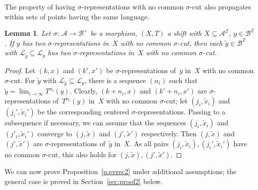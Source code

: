 \documentclass{amsart}
\newtheorem{lemma}{Lemma}[section]
\theoremstyle{definition}
\theoremstyle{remark}
\numberwithin{equation}{section}
\begin{document}
The property of having $\sigma$-representations with no common $\sigma$-cut also propagates within sets of points having the same language. 

\begin{lemma} \label{l:oneforall}
Let $\sigma:\, \mathcal{A} \to \mathcal{B}^+$ be a morphism, $(X,T)$ a shift with $X \subseteq \mathcal{A}^\mathbb{Z}$, $y \in \mathcal{B}^\mathbb{Z}$.
If $y$ has two $\sigma$-representations in~$X$ with no common $\sigma$-cut, then each $\tilde{y} \in \mathcal{B}^\mathbb{Z}$ with $\mathcal{L}_{\tilde{y}} \subseteq \mathcal{L}_y$ has two $\sigma$-representations in~$X$ with no common $\sigma$-cut. 
\end{lemma}

\begin{proof}
Let $(k,x)$ and $(k',x')$ be $\sigma$-representations of~$y$ in~$X$ with no common $\sigma$-cut.
For $\tilde{y}$ with $\mathcal{L}_{\tilde{y}} \subseteq \mathcal{L}_y$, there is a sequence $(n_i)$ such that $\tilde{y} = \lim_{i\to\infty} T^{n_i}(y)$. 
Clearly, $(k{+}n_i,x)$ and $(k'{+}n_i,x')$ are $\sigma$-representations of~$T^{n_i}(y)$ in~$X$ with no common $\sigma$-cut; let $(j_i, \tilde{x}_i)$ and $(j_i', \tilde{x}_i')$ be the corresponding centered $\sigma$-representations. 
Passing to a subsequence if necessary, we can assume that the sequences $(j_i, \tilde{x}_i)$ and $(j'_i, \tilde{x}_i')$ converge to $(j,\tilde{x})$ and $(j',\tilde{x}')$ respectively. 
Then $(j,\tilde{x})$ and $(j',\tilde{x}')$ are $\sigma$-representations of~$\tilde{y}$ in~$X$.
As all pairs $(j_i, \tilde{x}_i), (j_i', \tilde{x}_i')$ have no common $\sigma$-cut, this also holds for $(j,\tilde{x}), (j',\tilde{x}')$.
\end{proof}

We can now prove Proposition~\ref{p:evrec2} under additional assumptions; the general case is proved in Section~\ref{sec:proof2} below.
\end{document}
